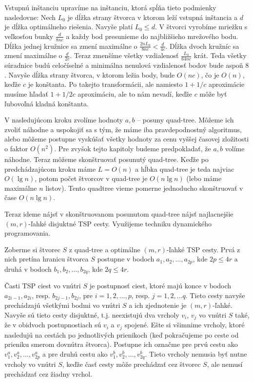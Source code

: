 Vstupnú inštanciu upravíme na inštanciu, ktorá spĺňa tieto podmienky nasledovne:
Nech $L_0$ je dĺžka strany štvorca v ktorom leží vstupná inštancia a $d$ je dĺžka optimálneho
riešenia. Navyše platí $L_0 \leq d$. V štvorci vyrobíme mriežku s veľkosťou bunky 
$\frac{d}{8nc}$ a každy bod presunieme do najbližšieho mrežového bodu.
Dĺžka jednej kružnice sa zmení maximálne o $\frac{2nL_0}{8nc} < \frac{d}{4c}$.
Dĺžka dvoch kružníc sa zmení maximálne o $\frac{d}{2c}$. Teraz zmenšíme všetky vzdialenosť
$\frac{L_0}{64nc}$ krát. Teda všetky súradnice budú celočíselné a minimálna nenulová vzdialenosť bodov
bude aspoň $8$. Navyše dĺžka strany štvorca, v ktorom ležia body, bude $O(nc)$, čo je $O(n)$, keďže
$c$ je konštanta.
Po takejto transformácii, ale namiesto $1 + 1/c$ aproximácie musíme hľadať $1 + 1/2c$ aproximáciu,
ale to nám nevadí, keďže $c$ môže byť ľubovoľná kladná konštanta.

\bigskip

V nasledujúcom kroku zvolíme hodnoty $a, b$ -- posuny quad-tree. Môžeme ich zvoliť náhodne
a uspokojiť sa s tým, že máme iba pravdepodnostný algoritmus, alebo môžeme postupne vyskúšať všetky
hodnoty za cenu vyššej časovej zložitosti o faktor $O(n^2)$. Pre zvyšok tejto kapitoly budeme
predpokladať, že $a, b$ volíme náhodne. Teraz môžeme skonštruovať posunutý quad-tree. 
Keďže po predchádzajúcom kroku máme $L = O(n)$ a hĺbka quad-tree je teda najviac $O(\lg n)$, potom
počet štvorcov v quad-tree je $O(n \lg n)$ (lebo máme maximálne $n$ listov). Tento quadtree vieme
pomerne jednoducho skonštruovať v čase $O(n \lg n)$.

Teraz ideme nájsť v skonštruovanom posunutom quad-tree nájsť najlacnejšie $(m,r)$-ľahké disjuktné
TSP cesty. Využijeme techniku dynamického programovania.

Zoberme si štvorec $S$ z quad-tree a optimálne $(m,r)$-ľahké TSP cesty. Prvá z nich pretína hranicu
štvorca $S$ postupne v bodoch $a_1, a_2, \dots, a_{2p}$, kde $2p \leq 4r$ a druhá v bodoch $b_1, b_2,
\dots, b_{2q}$, kde $2q \leq 4r$. 

Časti TSP ciest vo vnútri $S$ je postupnosť ciest, ktoré majú konce v bodoch $a_{2i - 1}, a_{2i}$,
resp. $b_{2j - 1}, b_{2j}$, pre $i = 1, 2, \dots, p$, resp. $j = 1, 2, \dots q$.
Tieto cesty navyše prechádzajú všetkými bodmi vo vnútri $S$ a ich zjednotenie je $(m,r)$-ľahké.
Navyše sú tieto cesty disjuktné, t.j. neexistujú dva vrcholy $v_i$, $v_j$ vo vnútri $S$ také, že 
v obidvoch postupnostiach sú $v_i$ a $v_j$ spojené.
Ešte si všimnime vrcholy, ktoré nasledujú na cestách po jednotlivých prienikoch (keď pokračujeme po
ceste od prieniku smerom dovnútra štvorca).
Postupne ich označme pre prvú cestu ako $v^a_1, v^a_2, \dots, v^a_{2p}$ a pre druhú cestu ako
$v^b_1, v^b_2, \dots, v^b_{2q}$. Tieto vrcholy nemusia byť nutne vrcholy vo vnútri $S$, keďže časť
cesty môže prechádzať cez štvorec $S$, ale nemusí prechádzať cez žiadny vrchol.

